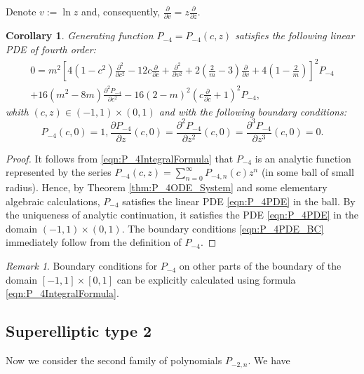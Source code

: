 \documentclass[review,nopreprintline]{elsarticle}
\newtheorem{corollary}[theorem]{Corollary}
\theoremstyle{definition}
\numberwithin{equation}{section}
\theoremstyle{remark}
\newtheorem{remark}[equation]{Remark}
\begin{document}
	        Denote $v:=\ln z$ and, consequently, $\frac{\partial}{\partial v}=z\frac{\partial }{\partial z}$.
	        \begin{corollary}\label{cor:P_4PDE} 
	        Generating function $P_{-4}=P_{-4}(c,z)$ satisfies the following linear PDE of fourth order:
	            \begin{multline}
	0= m^2\left[4(1-c^2)\frac{\partial^2 }{\partial c^2}-12 c\frac{\partial }{\partial c}+\frac{\partial^2 }{\partial v^2} +2 (\frac{2}{m}-3)\frac{\partial }{\partial v}+4(1-\frac{2}{m})\right]^2 P_{-4}\\
	+16(m^2-8m)\frac{\partial^2 P_{-4}}{\partial c^2}-16(2-m)^2(c\frac{\partial }{\partial c}+1)^2P_{-4}, \label{eqn:P_4PDE}
	\end{multline}
	 whith $(c,z)\in (-1,1)\times (0,1)$ and with the following boundary conditions:
	\begin{equation}\label{eqn:P_4PDE_BC}
	    P_{-4}(c,0)=1, \frac{\partial P_{-4}}{\partial z}(c,0)=\frac{\partial^2 P_{-4}}{\partial z^2}(c,0)=\frac{\partial^3 P_{-4}}{\partial z^3}(c,0)=0.
	\end{equation}        
	        \end{corollary}
	        \begin{proof}
	        It follows from  \eqref{eqn:P_4IntegralFormula} that $P_{-4}$ is an analytic function represented by the series $P_{-4}(c,z)=\sum\limits_{n=0}^{\infty} P_{-4,n}(c)z^n$ (in some ball of small radius). Hence, by Theorem \ref{thm:P_4ODE_System} and some elementary algebraic calculations, $P_{-4}$ satisfies the linear PDE \eqref{eqn:P_4PDE} in the ball. By the uniqueness of analytic continuation, it satisfies the PDE \eqref{eqn:P_4PDE} in the domain $(-1,1)\times (0,1)$. The boundary conditions \eqref{eqn:P_4PDE_BC} immediately follow from the definition of $P_{-4}$.
	        \end{proof}
	        \begin{remark}
	Boundary conditions for $P_{-4}$ on other parts of the boundary of the domain $[-1,1]\times [0,1]$ can be explicitly calculated using formula \eqref{eqn:P_4IntegralFormula}.
	        \end{remark}
	    \subsection{Superelliptic type 2}

	        Now we consider the second family of polynomials $P_{-2,n}$.
	       We have
	    
\end{document}
